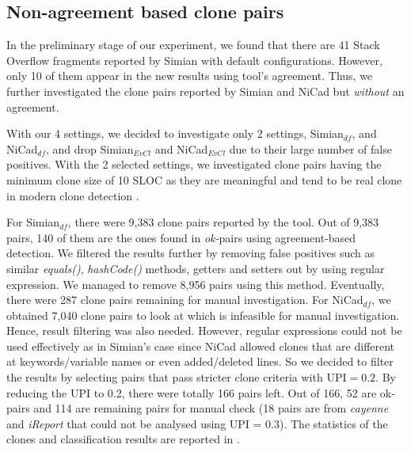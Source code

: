 \documentclass{sig-alternate-05-2015}
\begin{document}
\subsection{Non-agreement based clone pairs}
In the preliminary stage of our experiment, we found that there are 41 Stack Overflow fragments reported by Simian with default configurations. However, only 10 of them appear in the new results using tool's agreement. Thus, we further investigated the clone pairs reported by Simian and NiCad but \textit{without} an agreement. 

With our 4 settings, we decided to investigate only 2 settings, Simian$_{df}$, and NiCad$_{df}$, and drop Simian$_{\mathrm{\textit{EvCl}}}$ and NiCad$_{\mathrm{\textit{EvCl}}}$ due to their large number of false positives. With the 2 selected settings, we investigated clone pairs having the minimum clone size of 10 SLOC as they are meaningful and tend to be real clone in modern clone detection \cite{Sajnani2016}. 

For Simian$_{df}$, there were 9,383 clone pairs reported by the tool. Out of 9,383 pairs, 140 of them are the ones found in \textit{ok-}pairs using agreement-based detection. We filtered the results further by removing false positives such as similar \textit{equals()}, \textit{hashCode()} methods, getters and setters out by using regular expression. We managed to remove 8,956 pairs using this method. Eventually, there were 287 clone pairs remaining for manual investigation. For NiCad$_{df}$, we obtained 7,040 clone pairs to look at which is infeasible for manual investigation. Hence, result filtering was also needed. However, regular expressions could not be used effectively as in Simian's case since NiCad allowed clones that are different at keywords/variable names or even added/deleted lines. So we decided to filter the results by selecting pairs that pass stricter clone criteria with $\mathrm{UPI} = 0.2$. By reducing the UPI to 0.2, there were totally 166 pairs left. Out of 166, 52 are ok-pairs and 114 are remaining pairs for manual check (18 pairs are from \textit{cayenne} and \textit{iReport} that could not be analysed using UPI = 0.3). The statistics of the clones and classification results are reported in .

\end{document}
